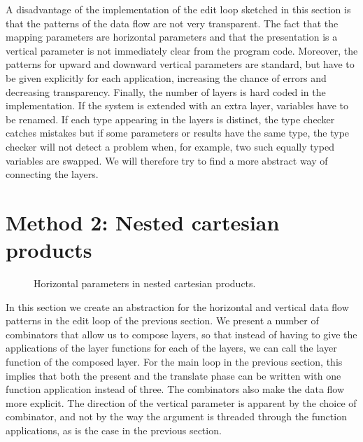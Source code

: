A disadvantage of the implementation of the edit loop sketched in this section is that the patterns of the data flow are not very transparent. The fact that the mapping parameters are horizontal parameters and that the presentation is a vertical parameter is not immediately clear from the program code. Moreover, the patterns for upward and downward vertical parameters are standard, but have to be given explicitly for each application, increasing the chance of errors and decreasing transparency. Finally, the number of layers is hard coded in the implementation. If the system is extended with an extra layer, variables have to be renamed. If each type appearing in the layers is distinct, the type checker catches mistakes but if some parameters or results have the same type, the type checker will not detect a problem when, for example, two such equally typed variables are swapped. We will therefore try to find a more abstract way of connecting the layers.


%									
%									
%									
\section{Method 2: Nested cartesian products}

\label{sectncp}
\begin{figure}
\begin{small}
\begin{center}
\begin{center}
\begin{scriptsize}
\end{scriptsize}
\end{center}\caption{ Horizontal parameters in nested cartesian
    products.}\label{ncp} 
\end{center}
\end{small}
\end{figure}

In this section we create an abstraction for the horizontal and vertical data flow patterns in the edit loop of the previous section. We present a number of combinators that allow us to compose layers, so that instead of having to give the applications of the layer functions for each of the layers, we can call the layer function of the composed layer. For the main loop in the previous section, this implies that both the present and the translate phase can be written with one function application instead of three. The combinators also make the data flow more explicit. The direction of the vertical parameter is apparent by the choice of combinator, and not by the way the argument is threaded through the function applications, as is the case in the previous section. 

